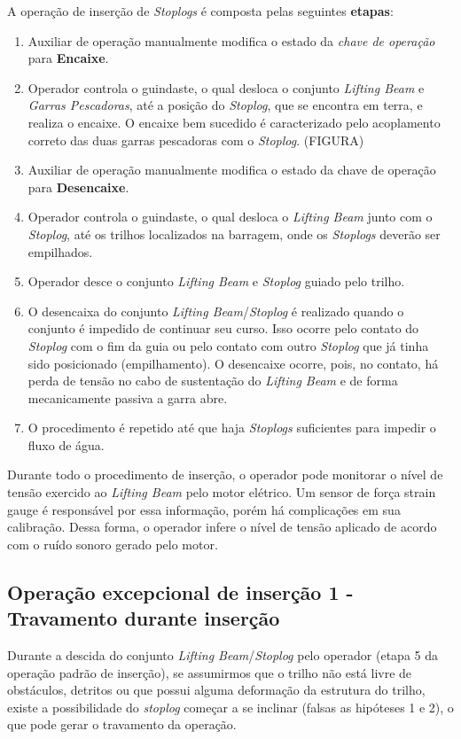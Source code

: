 A operação de inserção de \emph{Stoplogs} é composta pelas seguintes
\textbf{etapas}:
\begin{enumerate}
\item Auxiliar de operação manualmente modifica o estado da \emph{chave de operação} para \textbf{Encaixe}.
\item Operador controla o guindaste, o qual desloca o conjunto \emph{Lifting Beam} e \emph{Garras Pescadoras}, até a posição do \emph{Stoplog}, que se encontra em terra, e realiza o encaixe. O encaixe bem sucedido é caracterizado pelo acoplamento correto das duas garras pescadoras com o \emph{Stoplog}. (FIGURA)
\item Auxiliar de operação manualmente modifica o estado da chave de operação para \textbf{Desencaixe}.
\item Operador controla o guindaste, o qual desloca o \emph{Lifting Beam} junto com o \emph{Stoplog}, até os trilhos localizados na barragem, onde os \emph{Stoplogs} deverão ser empilhados.
\item Operador desce o conjunto \emph{Lifting Beam} e \emph{Stoplog} guiado pelo trilho.
\item O desencaixa do conjunto \emph{Lifting Beam}/\emph{Stoplog} é realizado quando o conjunto é impedido de continuar seu curso. Isso ocorre pelo contato do \emph{Stoplog} com o fim da guia ou pelo contato com outro \emph{Stoplog} que já tinha sido posicionado (empilhamento). O desencaixe ocorre, pois, no contato, há perda de tensão no cabo de sustentação do \emph{Lifting Beam} e de forma mecanicamente passiva a garra abre.
\item O procedimento é repetido até que haja \emph{Stoplogs} suficientes para impedir o fluxo de água.
\end{enumerate}

Durante todo o procedimento de inserção, o operador pode monitorar o nível de
tensão exercido ao \emph{Lifting Beam} pelo motor elétrico. Um sensor de força
strain gauge é responsável por essa informação, porém há complicações em sua
calibração. Dessa forma, o operador infere o nível de tensão aplicado de acordo
com o ruído sonoro gerado pelo motor.

\subsection{Operação excepcional de inserção 1 - Travamento durante inserção}

Durante a descida do conjunto  \emph{Lifting Beam}/\emph{Stoplog} pelo operador (etapa 5 da operação padrão de inserção), se assumirmos que o trilho não está livre de obstáculos, detritos ou que possui alguma deformação da estrutura do trilho, existe a possibilidade do \emph{stoplog} começar a se inclinar (falsas as
hipóteses 1 e 2), o que pode gerar o travamento da operação.

